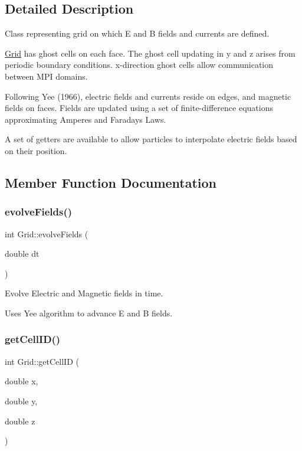 \subsection{Detailed Description}
Class representing grid on which E and B fields and currents are defined. 

\hyperlink{class_grid}{Grid} has ghost cells on each face. The ghost cell updating in y and z arises from periodic boundary conditions. x-\/direction ghost cells allow communication between M\+PI domains.

Following Yee (1966), electric fields and currents reside on edges, and magnetic fields on faces. Fields are updated using a set of finite-\/difference equations approximating Ampere\textquotesingle{}s and Faraday\textquotesingle{}s Laws.

A set of getters are available to allow particles to interpolate electric fields based on their position. 

\subsection{Member Function Documentation}
\hypertarget{class_grid_ab1cc80fe3a856f09d59b51ef558764c3}{}\label{class_grid_ab1cc80fe3a856f09d59b51ef558764c3} 
\subsubsection{\texorpdfstring{evolve\+Fields()}{evolveFields()}}
{\footnotesize\ttfamily int Grid\+::evolve\+Fields (\begin{DoxyParamCaption}\item[{double}]{dt }\end{DoxyParamCaption})}



Evolve Electric and Magnetic fields in time. 

Uses Yee algorithm to advance E and B fields. \hypertarget{class_grid_a7347c885ddb7abbcc9390b6fec4ba42b}{}\label{class_grid_a7347c885ddb7abbcc9390b6fec4ba42b} 
\subsubsection{\texorpdfstring{get\+Cell\+I\+D()}{getCellID()}}
{\footnotesize\ttfamily int Grid\+::get\+Cell\+ID (\begin{DoxyParamCaption}\item[{double}]{x,  }\item[{double}]{y,  }\item[{double}]{z }\end{DoxyParamCaption})}



